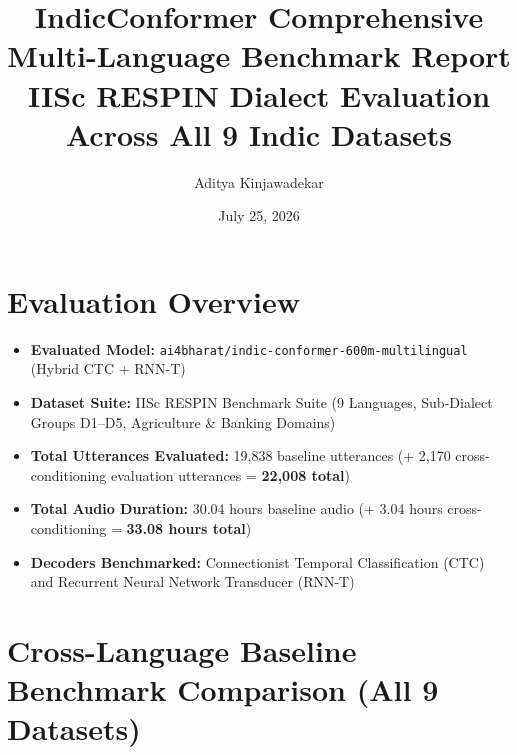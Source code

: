 \documentclass[10pt]{article}
\title{\textbf{IndicConformer Comprehensive Multi-Language Benchmark Report \\\large IISc RESPIN Dialect Evaluation Across All 9 Indic Datasets}}
\author{Aditya Kinjawadekar}
\date{July 25, 2026}
\begin{document}
\maketitle

\section*{Evaluation Overview}

\begin{itemize}
  \item \textbf{Evaluated Model:} \texttt{ai4bharat/indic-conformer-600m-multilingual} (Hybrid CTC + RNN-T)
  \item \textbf{Dataset Suite:} IISc RESPIN Benchmark Suite (9 Languages, Sub-Dialect Groups D1--D5, Agriculture \& Banking Domains)
  \item \textbf{Total Utterances Evaluated:} 19,838 baseline utterances (+ 2,170 cross-conditioning evaluation utterances = \textbf{22,008 total})
  \item \textbf{Total Audio Duration:} 30.04 hours baseline audio (+ 3.04 hours cross-conditioning = \textbf{33.08 hours total})
  \item \textbf{Decoders Benchmarked:} Connectionist Temporal Classification (CTC) and Recurrent Neural Network Transducer (RNN-T)
\end{itemize}

\section*{Cross-Language Baseline Benchmark Comparison (All 9 Datasets)}
\end{document}
